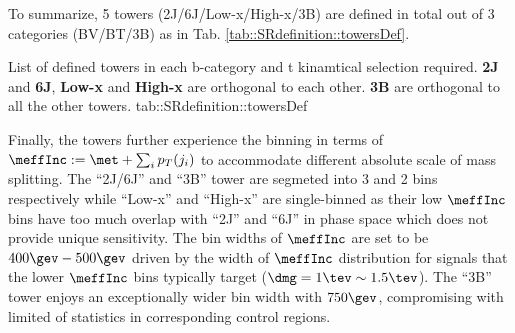 To summarize, 5 towers (2J/6J/Low-x/High-x/3B) are defined in total out of 3 categories (BV/BT/3B) as in Tab. \ref{tab::SRdefinition::towersDef}. 


{List of defined towers in each b-category and t kinamtical selection required. \textbf{2J} and \textbf{6J}, \textbf{Low-x} and \textbf{High-x} are orthogonal to each other. \textbf{3B} are orthogonal to all the other towers.}
{tab::SRdefinition::towersDef}


\clearpage
Finally, the towers further experience the binning in terms of $\meffInc := \met + \sum_{i} p_T (j_i)$ to accommodate different absolute scale of mass splitting. 
The ``2J/6J'' and ``3B'' tower are segmeted into 3 and 2 bins respectively while ``Low-x'' and ``High-x'' are single-binned as their low $\meffInc$ bins have too much overlap with ``2J'' and ``6J'' in phase space which does not provide unique sensitivity. The bin widths of $\meffInc$ are set to be $400\gev-500\gev$ driven by the width of $\meffInc$ distribution for signals that the lower $\meffInc$ bins typically target ($\dmg = 1\tev \sim 1.5\tev$). The ``3B'' tower enjoys an exceptionally wider bin width with $750\gev$, compromising with limited of statistics in corresponding control regions. \\

